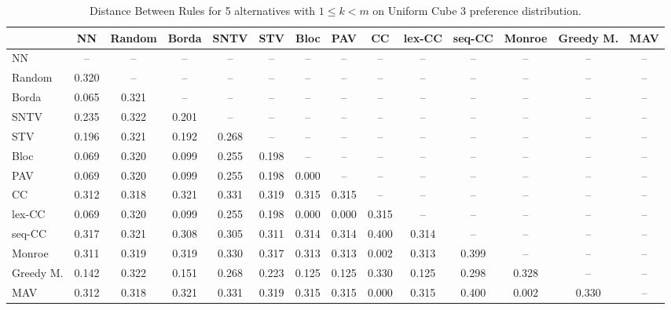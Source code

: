 
\begin{table*}
\centering
\begin{tabular}{lccccccccccccc}
\toprule
 & NN & Random & Borda & SNTV & STV & Bloc & PAV & CC & lex-CC & seq-CC & Monroe & Greedy M. & MAV \\
\midrule
NN & -- & -- & -- & -- & -- & -- & -- & -- & -- & -- & -- & -- & -- \\
Random & 0.320 & -- & -- & -- & -- & -- & -- & -- & -- & -- & -- & -- & -- \\
Borda & 0.065 & 0.321 & -- & -- & -- & -- & -- & -- & -- & -- & -- & -- & -- \\
SNTV & 0.235 & 0.322 & 0.201 & -- & -- & -- & -- & -- & -- & -- & -- & -- & -- \\
STV & 0.196 & 0.321 & 0.192 & 0.268 & -- & -- & -- & -- & -- & -- & -- & -- & -- \\
Bloc & 0.069 & 0.320 & 0.099 & 0.255 & 0.198 & -- & -- & -- & -- & -- & -- & -- & -- \\
PAV & 0.069 & 0.320 & 0.099 & 0.255 & 0.198 & 0.000 & -- & -- & -- & -- & -- & -- & -- \\
CC & 0.312 & 0.318 & 0.321 & 0.331 & 0.319 & 0.315 & 0.315 & -- & -- & -- & -- & -- & -- \\
lex-CC & 0.069 & 0.320 & 0.099 & 0.255 & 0.198 & 0.000 & 0.000 & 0.315 & -- & -- & -- & -- & -- \\
seq-CC & 0.317 & 0.321 & 0.308 & 0.305 & 0.311 & 0.314 & 0.314 & 0.400 & 0.314 & -- & -- & -- & -- \\
Monroe & 0.311 & 0.319 & 0.319 & 0.330 & 0.317 & 0.313 & 0.313 & 0.002 & 0.313 & 0.399 & -- & -- & -- \\
Greedy M. & 0.142 & 0.322 & 0.151 & 0.268 & 0.223 & 0.125 & 0.125 & 0.330 & 0.125 & 0.298 & 0.328 & -- & -- \\
MAV & 0.312 & 0.318 & 0.321 & 0.331 & 0.319 & 0.315 & 0.315 & 0.000 & 0.315 & 0.400 & 0.002 & 0.330 & -- \\
\bottomrule
\end{tabular}

\caption{Distance Between Rules for 5 alternatives with $1 \leq k < m$ on Uniform Cube 3 preference distribution.}
\end{table*}
